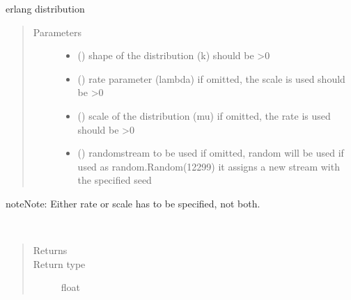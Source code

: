 \documentclass[letterpaper,10pt,english]{sphinxmanual}
\begin{document}
\begin{fulllineitems}
\label{\detokenize{Reference:salabim.Erlang}}
erlang distribution
\begin{quote}\begin{description}
\item[{Parameters}] \leavevmode\begin{itemize}
\item {} 
 () \textendash{} shape of the distribution (k) 
should be \textgreater{}0

\item {} 
 () \textendash{} rate parameter (lambda) 
if omitted, the scale is used 
should be \textgreater{}0

\item {} 
 () \textendash{} scale of the distribution (mu) 
if omitted, the rate is used 
should be \textgreater{}0

\item {} 
 () \textendash{} randomstream to be used 
if omitted, random will be used 
if used as random.Random(12299)
it assigns a new stream with the specified seed

\end{itemize}

\end{description}\end{quote}

\begin{sphinxadmonition}{note}{Note:}
Either rate or scale has to be specified, not both.
\end{sphinxadmonition}

\begin{fulllineitems}
\label{\detokenize{Reference:salabim.Erlang.mean}}~\begin{quote}\begin{description}
\item[{Returns}] \leavevmode
{}

\item[{Return type}] \leavevmode
float


\end{description}
\end{quote}
\end{fulllineitems}
\end{fulllineitems}
\end{document}
